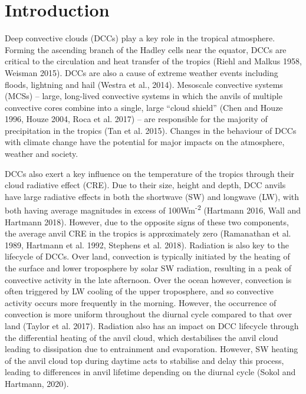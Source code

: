 \section{Introduction}

Deep convective clouds (DCCs) play a key role in the tropical
atmosphere. Forming the ascending branch of the Hadley cells near the
equator, DCCs are critical to the circulation and heat transfer of the
tropics (Riehl and Malkus 1958, Weisman 2015). DCCs are also a cause of
extreme weather events including floods, lightning and hail (Westra et
al., 2014). Mesoscale convective systems (MCSs) -- large, long-lived
convective systems in which the anvils of multiple convective cores
combine into a single, large ``cloud shield'' (Chen and Houze 1996,
Houze 2004, Roca et al. 2017) -- are responsible for the majority of
precipitation in the tropics (Tan et al. 2015). Changes in the behaviour
of DCCs with climate change have the potential for major impacts on the
atmosphere, weather and society.

DCCs also exert a key influence on the temperature of the tropics
through their cloud radiative effect (CRE). Due to their size, height
and depth, DCC anvils have large radiative effects in both the shortwave
(SW) and longwave (LW), with both having average magnitudes in excess of
100Wm\textsuperscript{-2} (Hartmann 2016, Wall and Hartmann 2018).
However, due to the opposite signs of these two components, the average
anvil CRE in the tropics is approximately zero (Ramanathan et al. 1989,
Hartmann et al. 1992, Stephens et al. 2018). Radiation is also key to
the lifecycle of DCCs. Over land, convection is typically initiated by
the heating of the surface and lower troposphere by solar SW radiation,
resulting in a peak of convective activity in the late afternoon. Over
the ocean however, convection is often triggered by LW cooling of the
upper troposphere, and so convective activity occurs more frequently in
the morning. However, the occurrence of convection is more uniform
throughout the diurnal cycle compared to that over land (Taylor et al.
2017). Radiation also has an impact on DCC lifecycle through the
differential heating of the anvil cloud, which destabilises the anvil
cloud leading to dissipation due to entrainment and evaporation.
However, SW heating of the anvil cloud top during daytime acts to
stabilise and delay this process, leading to differences in anvil
lifetime depending on the diurnal cycle (Sokol and Hartmann, 2020).

